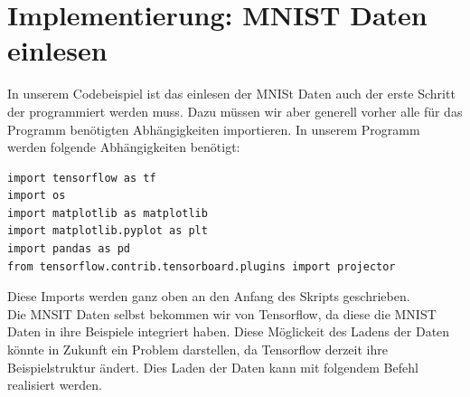 \section{Implementierung: MNIST Daten einlesen}
In unserem Codebeispiel ist das einlesen der MNISt Daten auch der erste Schritt der programmiert werden muss. Dazu müssen wir aber generell vorher alle für das Programm benötigten Abhängigkeiten importieren. In unserem Programm werden folgende Abhängigkeiten benötigt:
\lstset{language=Python}

\begin{lstlisting}
import tensorflow as tf
import os
import matplotlib as matplotlib
import matplotlib.pyplot as plt
import pandas as pd
from tensorflow.contrib.tensorboard.plugins import projector
\end{lstlisting}
Diese Imports werden ganz oben an den Anfang des Skripts geschrieben.\\
Die MNSIT Daten selbst bekommen wir von Tensorflow, da diese die MNIST Daten in ihre Beispiele integriert haben. Diese Möglickeit des Ladens der Daten könnte in Zukunft ein Problem darstellen, da Tensorflow derzeit ihre Beispielstruktur ändert. Dies Laden der Daten kann mit folgendem Befehl realisiert werden.
\lstset{language=Python}

